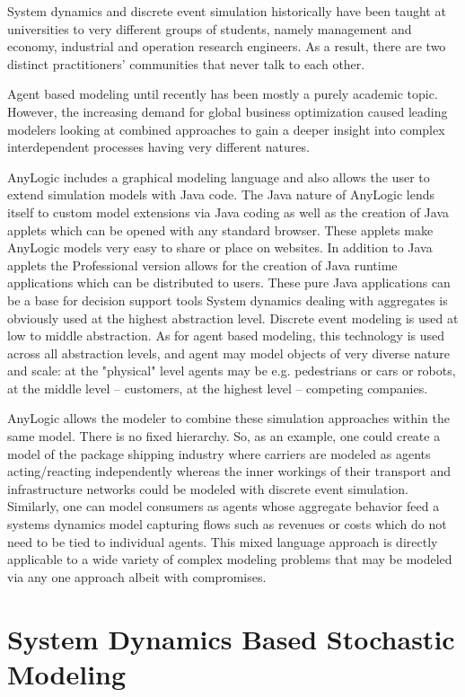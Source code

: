 System dynamics and discrete event simulation historically have been taught at universities to very different groups of students, namely management and economy, industrial and operation research engineers. As a result, there are two distinct practitioners' communities that never talk to each other.

Agent based modeling until recently has been mostly a purely academic topic. However, the increasing demand for global business optimization caused leading modelers looking at combined approaches to gain a deeper insight into complex interdependent processes having very different natures.

AnyLogic includes a graphical modeling language and also allows the user to extend simulation models with Java code. The Java nature of AnyLogic lends itself to custom model extensions via Java coding as well as the creation of Java applets which can be opened with any standard browser. These applets make AnyLogic models very easy to share or place on websites. In addition to Java applets the Professional version allows for the creation of Java runtime applications which can be distributed to users. These pure Java applications can be a base for decision support tools System dynamics dealing with aggregates is obviously used at the highest abstraction level. Discrete event modeling is used at low to middle abstraction. As for agent based modeling, this technology is used across all abstraction levels, and agent may model objects of very diverse nature and scale: at the "physical" level agents may be e.g. pedestrians or cars or robots, at the middle level – customers, at the highest level – competing companies.

AnyLogic allows the modeler to combine these simulation approaches within the same model. There is no fixed hierarchy. So, as an example, one could create a model of the package shipping industry where carriers are modeled as agents acting/reacting independently whereas the inner workings of their transport and infrastructure networks could be modeled with discrete event simulation. Similarly, one can model consumers as agents whose aggregate behavior feed a systems dynamics model capturing flows such as revenues or costs which do not need to be tied to individual agents. This mixed language approach is directly applicable to a wide variety of complex modeling problems that may be modeled via any one approach albeit with compromises.


\section{System Dynamics Based Stochastic Modeling}

